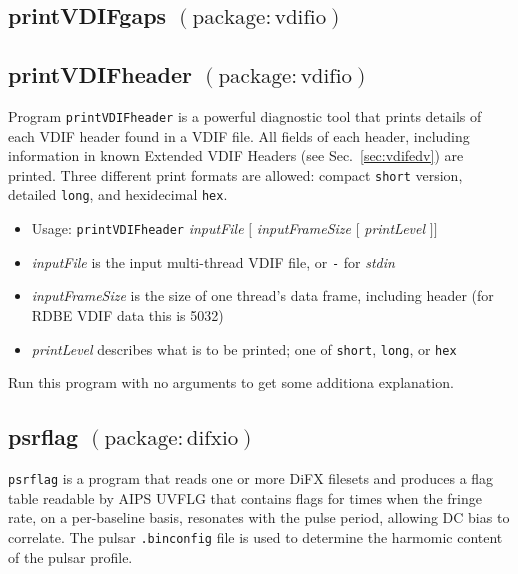 
\subsection{printVDIFgaps {\small $\mathrm{(package: vdifio)}$}} \label{sec:printVDIFgaps}




\subsection{printVDIFheader {\small $\mathrm{(package: vdifio)}$}} \label{sec:printVDIFheader}

Program {\tt printVDIFheader} is a powerful diagnostic tool that prints details of each VDIF header found in a VDIF file.
All fields of each header, including information in known Extended VDIF Headers (see Sec.~\ref{sec:vdifedv}) are printed.
Three different print formats are allowed: compact {\tt short} version, detailed {\tt long}, and hexidecimal {\tt hex}.

\begin{itemize}
\item[] Usage: {\tt printVDIFheader} {\em inputFile} $ [ $ {\em inputFrameSize} $ [ $ {\em printLevel} $ ] ] $
\item[] {\em inputFile} is the input multi-thread VDIF file, or {\tt -} for {\em stdin}
\item[] {\em inputFrameSize} is the size of one thread's data frame, including header (for RDBE VDIF data this is 5032)
\item[] {\em printLevel} describes what is to be printed; one of {\tt short}, {\tt long}, or {\tt hex}
\end{itemize}

Run this program with no arguments to get some additiona explanation.





\subsection{psrflag {\small $\mathrm{(package: difxio)}$}} \label{sec:psrflag}

{\tt psrflag} is a program that reads one or more DiFX filesets and produces a flag table readable by AIPS UVFLG that contains flags for times when the fringe rate, on a per-baseline basis, resonates with the pulse period, allowing DC bias to correlate.
The pulsar {\tt .binconfig} file is used to determine the harmomic content of the pulsar profile.

